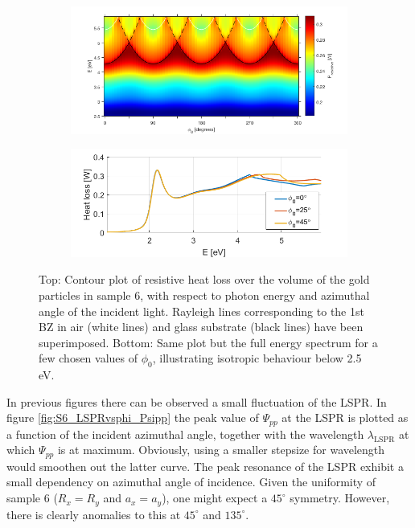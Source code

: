 \begin{figure}[h!]  %
    \begin{subfigure}{\textwidth}
        \centering
        \includegraphics[width=0.8\linewidth, trim=0cm 0cm 1cm 0.5cm, clip]{figures/ch4/S6/contour/S6_HeatLoss_contour(1).png}
    \end{subfigure}
    
    \begin{subfigure}{\textwidth}
        \centering
        \includegraphics[width=0.6\linewidth, trim=0cm 0cm 0cm 0cm, clip]{figures/ch4/S6/contour/S6_HeatLoss_phi=0,25,45.png}
    \end{subfigure}
    
    \caption{Top: Contour plot of resistive heat loss over the volume of the gold particles in sample 6, with respect to photon energy and azimuthal angle of the incident light. Rayleigh lines corresponding to the 1st BZ in air (white lines) and glass substrate (black lines) have been superimposed. Bottom: Same plot but the full energy spectrum for a few chosen values of $\phi_0$, illustrating isotropic behaviour below 2.5 eV.}
    \label{fig:S6_heatloss}
\end{figure}
In previous figures there can be observed a small fluctuation of the LSPR. In figure \ref{fig:S6_LSPRvsphi_Psipp} the peak value of $\Psi_{pp}$ at the LSPR is plotted as a function of the incident azimuthal angle, together with the wavelength $\lambda_{\text{LSPR}}$ at which $\Psi_{pp}$ is at maximum. Obviously, using a smaller stepsize for wavelength would smoothen out the latter curve. The peak resonance of the LSPR exhibit a small dependency on azimuthal angle of incidence. Given the uniformity of sample 6 ($R_{x}=R_{y}$ and $a_x=a_y$), one might expect a $45^\circ$ symmetry. However, there is clearly anomalies to this at $45^\circ$ and $135^\circ$. 

